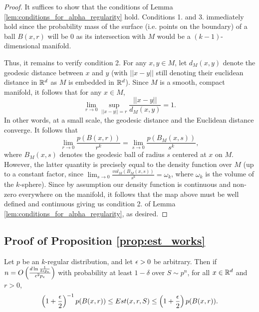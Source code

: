 \begin{proof}
It suffices to show that the conditions of Lemma \ref{lem:conditions_for_alpha_regularity} hold. Conditions 1. and 3. immediately hold since the probability mass of the surface (i.e. points on the boundary) of a ball $B(x, r)$ will be $0$ as its intersection with $M$ would be a $(k-1)$-dimensional manifold. 

Thus, it remains to verify condition 2. For any $x, y \in M$, let $d_M(x, y)$ denote the geodesic distance between $x$ and $y$ (with $||x - y||$ still denoting their euclidean distance in $\mathbb{R}^d$ as $M$ is embedded in $\mathbb{R}^d$). Since $M$ is a smooth, compact manifold, it follows that for any $x \in M$, $$\lim_{r \to 0} \sup_{||x - y|| = r}\frac{||x- y||}{d_M(x, y)}  = 1.$$ In other words, at a small scale, the geodesic distance and the Euclidean distance converge. It follows that $$\lim_{r \to 0} \frac{p(B(x, r))}{r^k} = \lim_{s \to 0} \frac{p(B_M(x, s))}{s^k},$$ where $B_M(x, s)$ denotes the geodesic ball of radius $s$ centered at $x$ on $M$. However, the latter quantity is precisely equal to the density function over $M$ (up to a constant factor, since $\lim_{s \to 0} \frac{vol_M(B_M(x, s))}{s^k} = \omega_k$, where $\omega_k$ is the volume of the $k$-sphere). Since by assumption our density function is continuous and non-zero everywhere on the manifold, it follows that the map above must be well defined and continuous giving us condition 2. of Lemma \ref{lem:conditions_for_alpha_regularity}, as desired. 
\end{proof}

\subsection{Proof of Proposition \ref{prop:est_works}}\label{sec:est_works}

\begin{proposition}
Let $p$ be an $k$-regular distribution, and let $\epsilon >0$ be arbitrary. Then if $n = O\left(\frac{d\ln\frac{1}{\delta \epsilon p_\epsilon}}{\epsilon^2 p_\epsilon}\right)$ with probability at least $1 - \delta$ over $S \sim p^n$, for all $x \in \mathbb{R}^d$ and $r > 0$, \begin{equation}\label{eqn:prop_est_works}\left(1+\frac{\epsilon}{2}\right)^{-1}p(B(x,r))\leq Est(x, r, S) \leq \left(1+\frac{\epsilon}{2}\right)p(B(x,r)).\end{equation}
\end{proposition}

